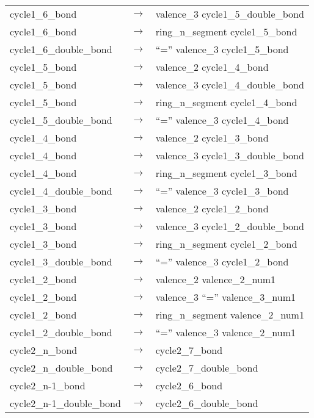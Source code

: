 \begin{longtable}{m{} p{} p{}}
    cycle1\_6\_bond & $\rightarrow$ & valence\_3 cycle1\_5\_double\_bond \\
    cycle1\_6\_bond & $\rightarrow$ & ring\_n\_segment cycle1\_5\_bond \\
    cycle1\_6\_double\_bond & $\rightarrow$ & ``='' valence\_3 cycle1\_5\_bond \\
    cycle1\_5\_bond & $\rightarrow$ & valence\_2 cycle1\_4\_bond \\
    cycle1\_5\_bond & $\rightarrow$ & valence\_3 cycle1\_4\_double\_bond \\
    cycle1\_5\_bond & $\rightarrow$ & ring\_n\_segment cycle1\_4\_bond \\
    cycle1\_5\_double\_bond & $\rightarrow$ & ``='' valence\_3 cycle1\_4\_bond \\
    cycle1\_4\_bond & $\rightarrow$ & valence\_2 cycle1\_3\_bond \\
    cycle1\_4\_bond & $\rightarrow$ & valence\_3 cycle1\_3\_double\_bond \\
    cycle1\_4\_bond & $\rightarrow$ & ring\_n\_segment cycle1\_3\_bond \\
    cycle1\_4\_double\_bond & $\rightarrow$ & ``='' valence\_3 cycle1\_3\_bond \\
    cycle1\_3\_bond & $\rightarrow$ & valence\_2 cycle1\_2\_bond \\
    cycle1\_3\_bond & $\rightarrow$ & valence\_3 cycle1\_2\_double\_bond \\
    cycle1\_3\_bond & $\rightarrow$ & ring\_n\_segment cycle1\_2\_bond \\
    cycle1\_3\_double\_bond & $\rightarrow$ & ``='' valence\_3 cycle1\_2\_bond \\
    cycle1\_2\_bond & $\rightarrow$ & valence\_2 valence\_2\_num1 \\
    cycle1\_2\_bond & $\rightarrow$ & valence\_3 ``='' valence\_3\_num1 \\
    cycle1\_2\_bond & $\rightarrow$ & ring\_n\_segment valence\_2\_num1 \\
    cycle1\_2\_double\_bond & $\rightarrow$ & ``='' valence\_3 valence\_2\_num1 \\
    cycle2\_n\_bond & $\rightarrow$ & cycle2\_7\_bond \\
    cycle2\_n\_double\_bond & $\rightarrow$ & cycle2\_7\_double\_bond \\
    cycle2\_n-1\_bond & $\rightarrow$ & cycle2\_6\_bond \\
    cycle2\_n-1\_double\_bond & $\rightarrow$ & cycle2\_6\_double\_bond \\

\end{longtable}

